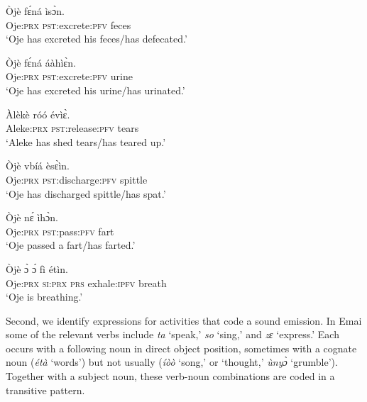 \documentclass[output=paper,colorlinks,citecolor=brown
]{langscibook}
\begin{document}
 \ea \label{ex:schaefer:sheg10}
\begin{xlist}
\ex \label{ex:schaefer:sheg10a}
    \gll Òjè fɛ́ná ìsɔ̀n. \\
          Oje:\textsc{prx} \textsc{pst}:excrete:\textsc{pfv} feces \\
           \glt  ‘Oje has excreted his feces/has defecated.’

    \ex \label{ex:schaefer:sheg10b}
    \gll Òjè fɛ́ná áàhìɛ̀n. \\
          Oje:\textsc{prx}   \textsc{pst}:excrete:\textsc{pfv} urine \\
           \glt  ‘Oje has excreted his urine/has urinated.’

    \ex \label{ex:schaefer:sheg10c}
    \gll Àlèkè róó évìɛ̀. \\
          {Aleke:\textsc{prx}} {\textsc{pst}:release:\textsc{pfv}} tears
        \\
           \glt  ‘Aleke has shed tears/has teared up.’

    \ex \label{ex:schaefer:sheg10d}
    \gll Òjè vbíá èsɛ̀ìn.  \\
          Oje:\textsc{prx}   {\textsc{pst}:discharge:\textsc{pfv}} spittle
        \\
           \glt  ‘Oje has discharged spittle/has spat.’

    \ex \label{ex:schaefer:sheg10e}
    \gll Òjè nɛ́ ìhɔ̀n.  \\
          Oje:\textsc{prx}   {\textsc{pst}:pass:\textsc{pfv}} fart       \\
           \glt ‘Oje passed a fart/has farted.’

    \ex \label{ex:schaefer:sheg10f}
    \gll Òjè ɔ̀ ɔ́ fì étìn.  \\
         Oje:\textsc{prx}   {\textsc{si:prx}} \textsc{prs} {exhale:\textsc{ipfv}} breath      \\
           \glt ‘Oje is breathing.’
    
\end{xlist}
\z	

Second, we identify expressions for activities that code a sound emission. In Emai some of the relevant verbs include \textit{ta} ‘speak,’ \textit{so} ‘sing,’ and \textit{zɛ} ‘express.’ Each occurs with a following noun in direct object position, sometimes with a cognate noun (\textit{étà} ‘words’) but not usually (\textit{íòò} ‘song,’ or ‘thought,’ \textit{ùnyɔ̀} ‘grumble’). Together with a subject noun, these verb-noun combinations are coded in a transitive pattern.  
\end{document}
